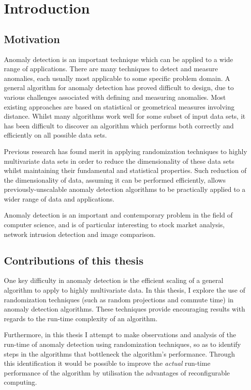 \chapter{Introduction}
\label{ch:intro}

\section{Motivation}
\label{sec:motivation}
Anomaly detection is an important technique which can be applied to a wide 
range of applications. There are many techniques to detect and measure 
anomalies, each usually most applicable to some specific problem domain. A 
general algorithm for anomaly detection has proved difficult to design, due to 
various challenges associated with defining and measuring anomalies. Most 
existing approaches are based on statistical or geometrical measures involving 
distance. Whilst many algorithms work well for some subset of input data sets, 
it has been difficult to discover an algorithm which performs both correctly and
efficiently on all possible data sets.

Previous research has found merit in applying randomization techniques to highly
multivariate data sets in order to reduce the dimensionality of these data sets 
whilst maintaining their fundamental and statistical properties. Such reduction 
of the dimensionality of data, assuming it can be performed efficiently, allows 
previously-unscalable anomaly detection algorithms to be practically applied to 
a wider range of data and applications.

Anomaly detection is an important and contemporary problem in the field of 
computer science, and is of particular interesting to stock market analysis, 
network intrusion detection and image comparison.

\section{Contributions of this thesis}
\label{sec:contributions}
One key difficulty in anomaly detection is the efficient scaling of a general 
algorithm to apply to highly multivariate data. In this thesis, I explore the 
use of randomization techniques (such as random projections and commute time) 
in anomaly detection algorithms. These techniques provide encouraging results 
with regards to the run-time complexity of an algorithm.

Furthermore, in this thesis I attempt to make observations and analysis of the 
run-time of anomaly detection using randomization techniques, so as to identify
steps in the algorithms that bottleneck the algorithm's performance. Through 
this identification it would be possible to improve the \emph{actual} run-time 
performance of the algorithm by utilisation the advantages of reconfigurable 
computing.

